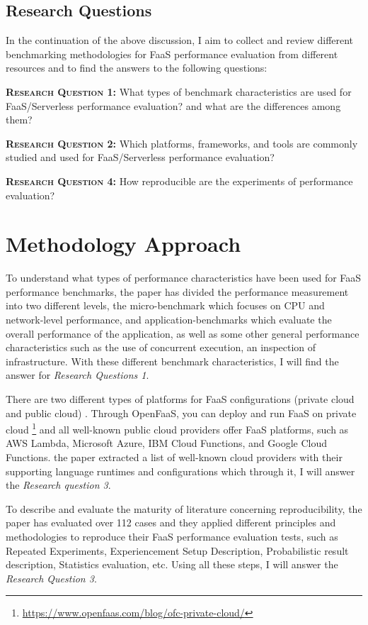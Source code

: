 \subsection{Research Questions}
In the continuation of the above discussion, I aim to collect and review different benchmarking methodologies for FaaS performance evaluation from different resources and to find the answers to the following questions:

\textbf{\textsc{Research Question 1:}} What types of benchmark characteristics are used for FaaS/Serverless performance evaluation? and what are the differences among them?

\textbf{\textsc{Research Question 2:}} Which platforms, frameworks, and tools are commonly studied and used for FaaS/Serverless performance evaluation?

\textbf{\textsc{Research Question 4:}} How reproducible are the experiments of performance evaluation?


%
\section{Methodology Approach}
\label{sec:methodology-approach}
To understand what types of performance characteristics have been used for FaaS performance benchmarks, the paper \cite{scheuner2020state} has divided the performance measurement into two different levels, the micro-benchmark which focuses on CPU and network-level performance, and application-benchmarks which evaluate the overall performance of the application, as well as some other general performance characteristics such as the use of concurrent execution, an inspection of infrastructure. With these different benchmark characteristics, I will find the answer for \emph{Research Questions 1}.

There are two different types of platforms for FaaS configurations (private cloud and public cloud) \cite{van2017spec}. Through OpenFaaS, you can deploy and run FaaS on private cloud \footnote{\url{https://www.openfaas.com/blog/ofc-private-cloud/}} and all well-known public cloud providers offer FaaS platforms, such as AWS Lambda, Microsoft Azure, IBM Cloud Functions, and Google Cloud Functions. the paper \cite{scheuner2020state} extracted a list of well-known cloud providers with their supporting language runtimes and configurations which through it, I will answer the \emph{Research question 3}.

To describe and evaluate the maturity of literature concerning reproducibility, the paper \cite{scheuner2020state} has evaluated over 112 cases and they applied different principles and methodologies to reproduce their FaaS performance evaluation tests, such as Repeated Experiments, Experiencement Setup Description, Probabilistic result description, Statistics evaluation, etc. Using all these steps, I will answer the \emph{Research Question 3}.

